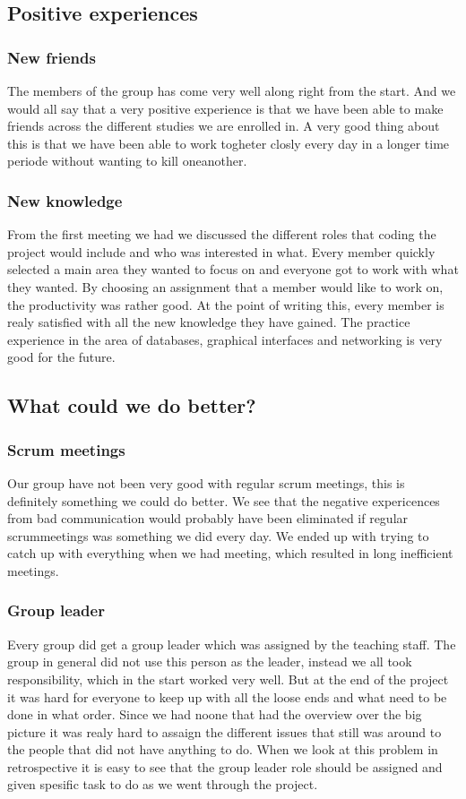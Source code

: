 \documentclass[a4paper, 10pt]{article}
\begin{document}
\subsection{Positive experiences}
\subsubsection{New friends}
The members of the group has come very well along right from the start. And we would all say that a very positive experience is that we have been able to make friends across the different studies we are enrolled in. A very good thing about this is that we have been able to work togheter closly every day in a longer time periode without wanting to kill oneanother.

\subsubsection{New knowledge}
From the first meeting we had we discussed the different roles that coding the project would include and who was interested in what. Every member quickly selected a main area they wanted to focus on and everyone got to work with what they wanted. By choosing an assignment that a member would like to work on, the productivity was rather good. At the point of writing this, every member is realy satisfied with all the new knowledge they have gained. The practice experience in the area of databases, graphical interfaces and networking is very good for the future.



\subsection{What could we do better?}
\subsubsection{Scrum meetings}
Our group have not been very good with regular scrum meetings, this is definitely something we could do better. We see that the negative expericences from bad communication would probably have been eliminated if regular scrummeetings was something we did every day. We ended up with trying to catch up with everything when we had meeting, which resulted in long inefficient meetings. 
\subsubsection{Group leader}
Every group did get a group leader which was assigned by the teaching staff. The group in general did not use this person as the leader, instead we all took responsibility, which in the start worked very well. But at the end of the project it was hard for everyone to keep up with all the loose ends and what need to be done in what order.  Since we had noone that had the overview over the big picture it was realy hard to assaign the different issues that still was around to the people that did not have anything to do. When we look at this problem in retrospective it is easy to see that the group leader role should be assigned and given spesific task to do as we went through the project.
\end{document}
